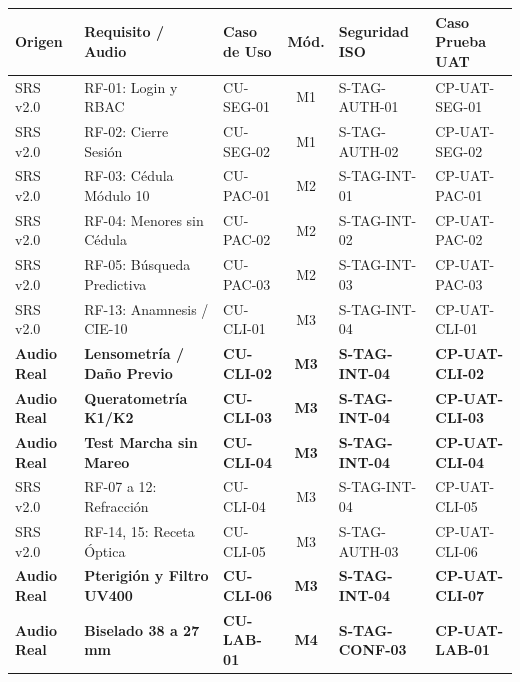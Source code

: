 \documentclass[12pt,a4paper]{report}
\begin{document}
\begin{table}[H]
\centering
\scriptsize
\begin{tabularx}{\textwidth}{|L{2.2cm}|L{3.2cm}|L{2.3cm}|c|L{2.3cm}|L{2.5cm}|}
\hline
{}\color{white}\textbf{Origen} & \color{white}\textbf{Requisito / Audio} & \color{white}\textbf{Caso de Uso} & \color{white}\textbf{Mód.} & \color{white}\textbf{Seguridad ISO} & \color{white}\textbf{Caso Prueba UAT} \\
\hline
SRS v2.0 & RF-01: Login y RBAC & CU-SEG-01 & M1 & S-TAG-AUTH-01 & CP-UAT-SEG-01 \\
\hline
SRS v2.0 & RF-02: Cierre Sesión & CU-SEG-02 & M1 & S-TAG-AUTH-02 & CP-UAT-SEG-02 \\
\hline
SRS v2.0 & RF-03: Cédula Módulo 10 & CU-PAC-01 & M2 & S-TAG-INT-01 & CP-UAT-PAC-01 \\
\hline
SRS v2.0 & RF-04: Menores sin Cédula & CU-PAC-02 & M2 & S-TAG-INT-02 & CP-UAT-PAC-02 \\
\hline
SRS v2.0 & RF-05: Búsqueda Predictiva & CU-PAC-03 & M2 & S-TAG-INT-03 & CP-UAT-PAC-03 \\
\hline
SRS v2.0 & RF-13: Anamnesis / CIE-10 & CU-CLI-01 & M3 & S-TAG-INT-04 & CP-UAT-CLI-01 \\
\hline
{}\textbf{Audio Real} & \textbf{Lensometría / Daño Previo} & \textbf{CU-CLI-02} & \textbf{M3} & \textbf{S-TAG-INT-04} & \textbf{CP-UAT-CLI-02} \\
\hline
{}\textbf{Audio Real} & \textbf{Queratometría K1/K2} & \textbf{CU-CLI-03} & \textbf{M3} & \textbf{S-TAG-INT-04} & \textbf{CP-UAT-CLI-03} \\
\hline
{}\textbf{Audio Real} & \textbf{Test Marcha sin Mareo} & \textbf{CU-CLI-04} & \textbf{M3} & \textbf{S-TAG-INT-04} & \textbf{CP-UAT-CLI-04} \\
\hline
SRS v2.0 & RF-07 a 12: Refracción & CU-CLI-04 & M3 & S-TAG-INT-04 & CP-UAT-CLI-05 \\
\hline
SRS v2.0 & RF-14, 15: Receta Óptica & CU-CLI-05 & M3 & S-TAG-AUTH-03 & CP-UAT-CLI-06 \\
\hline
{}\textbf{Audio Real} & \textbf{Pterigión y Filtro UV400} & \textbf{CU-CLI-06} & \textbf{M3} & \textbf{S-TAG-INT-04} & \textbf{CP-UAT-CLI-07} \\
\hline
{}\textbf{Audio Real} & \textbf{Biselado 38 a 27 mm} & \textbf{CU-LAB-01} & \textbf{M4} & \textbf{S-TAG-CONF-03} & \textbf{CP-UAT-LAB-01} \\

\end{tabularx}
\end{table}
\end{document}
